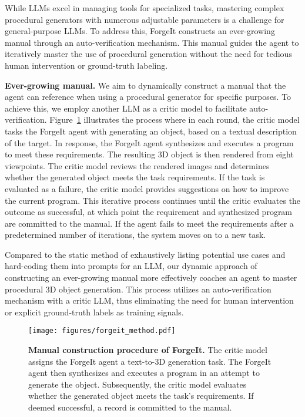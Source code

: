 While LLMs excel in managing tools for specialized tasks, mastering complex procedural generators with numerous adjustable parameters is a challenge for general-purpose LLMs. To address this, ForgeIt constructs an ever-growing manual through an auto-verification mechanism. This manual guides the agent to iteratively master the use of procedural generation without the need for tedious human intervention or ground-truth labeling.


\noindent\textbf{Ever-growing manual.} We aim to dynamically construct a manual that the agent can reference when using a procedural generator for specific purposes. To achieve this, we employ another LLM as a critic model to facilitate auto-verification. 
Figure~\ref{fig:forgeit_method} illustrates the process where in each round, the critic model tasks the ForgeIt agent with generating an object, based on a textual description of the target. In response, the ForgeIt agent synthesizes and executes a program to meet these requirements. The resulting 3D object is then rendered from eight viewpoints. The critic model reviews the rendered images and determines whether the generated object meets the task requirements. If the task is evaluated as a failure, the critic model provides suggestions on how to improve the current program. This iterative process continues until the critic evaluates the outcome as successful, at which point the requirement and synthesized program are committed to the manual. If the agent fails to meet the requirements after a predetermined number of iterations, the system moves on to a new task.

Compared to the static method of exhaustively listing potential use cases and hard-coding them into prompts for an LLM, our dynamic approach of constructing an ever-growing manual more effectively coaches an agent to master procedural 3D object generation. This process utilizes an auto-verification mechanism with a critic LLM, thus eliminating the need for human intervention or explicit ground-truth labels as training signals. 



\begin{figure}[t]
\begin{center}
    \texttt{[image: figures/forgeit\_method.pdf]}
\end{center}
\caption{\textbf{Manual construction procedure of ForgeIt.}
The critic model assigns the ForgeIt agent a text-to-3D generation task. The ForgeIt agent then synthesizes and executes a program in an attempt to generate the object. Subsequently, the critic model evaluates whether the generated object meets the task's requirements. If deemed successful, a record is committed to the manual.
}
\label{fig:forgeit_method}
\end{figure}






